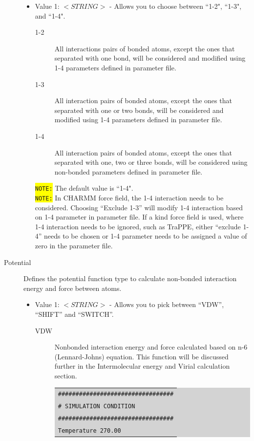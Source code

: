 \begin{description}
\begin{itemize}
	\item Value 1: $<STRING>$ - Allows you to choose between ``1-2", ``1-3", and ``1-4".
		\begin{description}
		\item [1-2] All interactions pairs of bonded atoms, except the ones that separated with one bond, will be considered and modified using 1-4 parameters defined in parameter file.
		\item [1-3] All interaction pairs of bonded atoms, except the ones that separated with one or two bonds, will be considered and modified using 1-4 parameters defined in parameter file.
		\item [1-4] All interaction pairs of bonded atoms, except the ones that separated with one, two or three bonds, will be considered using non-bonded parameters defined in parameter file.
		\end{description}
		\colorbox{yellow}{\texttt{NOTE:}} The default value is ``1-4".\\
		\colorbox{yellow}{\texttt{NOTE:}} In CHARMM force field, the 1-4 interaction needs to be considered. Choosing ``Exclude 1-3'' will modify 1-4 interaction based on 1-4 parameter in parameter file. If a kind force field is used, where 1-4 interaction needs to be ignored, such as TraPPE, either ``exclude 1-4'' needs to be chosen or 1-4 parameter needs to be assigned a value of zero in the parameter file.
	\end{itemize}
\item [Potential] Defines the potential function type to calculate non-bonded interaction energy and force between atoms.
	\begin{itemize}
	\item Value 1: $<STRING>$ - Allows you to pick between ``VDW'', ``SHIFT'' and ``SWITCH''.
		\begin{description}
		\item [VDW] Nonbonded interaction energy and force calculated based on n-6 (Lennard-Johns) equation. This function will be discussed further in the Intermolecular energy and Virial calculation section.\\
		\colorbox{lightgray}{
		\begin{tabular}{l}
		\texttt{\#\#\#\#\#\#\#\#\#\#\#\#\#\#\#\#\#\#\#\#\#\#\#\#\#\#\#\#\#\#\#\#\#}\\
		\texttt{\# SIMULATION CONDITION}\\
		\texttt{\#\#\#\#\#\#\#\#\#\#\#\#\#\#\#\#\#\#\#\#\#\#\#\#\#\#\#\#\#\#\#\#\#}\\
		\texttt{Temperature 270.00}\\

\end{tabular}}
\end{description}
\end{itemize}
\end{description}
